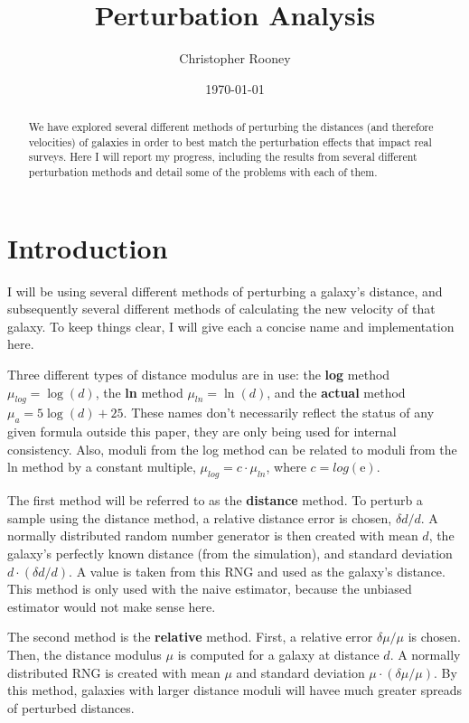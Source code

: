 \documentclass[usenatbib]{mn2e}
\newcommand{\e}{{\mathrm e}}
\begin{document}
\author{Christopher Rooney}
\date{\today}
\title{Perturbation Analysis}
\maketitle

\begin{abstract}
We have explored several different methods of perturbing the distances (and therefore velocities) of galaxies in order to best match the perturbation effects that impact real surveys. Here I will report my progress, including the results from several different perturbation methods and detail some of the problems with each of them.
\end{abstract}

\section{Introduction}
I will be using several different methods of perturbing a galaxy's distance, and subsequently several different methods of calculating the new velocity of that galaxy. To keep things clear, I will give each a concise name and implementation here. 

Three different types of distance modulus are in use: the \textbf{log} method $\mu_{log} = \log\left(d\right)$, the \textbf{ln} method $\mu_{ln} = \ln\left(d\right)$, and the \textbf{actual} method $\mu_a = 5\log\left(d\right) + 25$. These names don't necessarily reflect the status of any given formula outside this paper, they are only being used for internal consistency. Also, moduli from the log method can be related to moduli from the ln method by a constant multiple, $\mu_{log} = c\cdot \mu_{ln}$, where $c = log(\e)$.

The first method will be referred to as the \textbf{distance} method. To perturb a sample using the distance method, a relative distance error is chosen, $\delta d/d$. A normally distributed random number generator is then created with mean $d$, the galaxy's perfectly known distance (from the simulation), and standard deviation $d\cdot\left(\delta d/d\right)$. A value is taken from this RNG and used as the galaxy's distance. This method is only used with the naive estimator, because the unbiased estimator would not make sense here.

The second method is the \textbf{relative} method. First, a relative error $\delta \mu / \mu$ is chosen. Then, the distance modulus $\mu$ is computed for a galaxy at distance $d$. A normally distributed RNG is created with mean $\mu$ and standard deviation $\mu \cdot \left(\delta \mu / \mu\right)$. By this method, galaxies with larger distance moduli will havee much greater spreads of perturbed distances.
\end{document}
